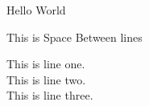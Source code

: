 \documentclass{article}
\begin{document}
Hello World

This is Space Between lines


\begin{center}
This is line one. \\
This is line two. \\
This is line three.
\end{center}
\end{document}
